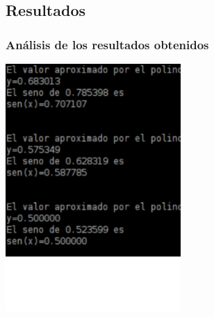 \documentclass{beamer}
\begin{document}
\subsection{Resultados}
\begin{frame}
\frametitle{Análisis de los resultados obtenidos}
\includegraphics[width=0.5\textwidth]{img/comprobacion}
\end{frame}
\end{document}
